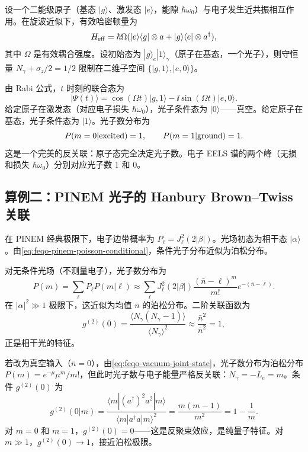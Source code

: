 \begin{workedexample}[二能级原子的光子统计]
设一个二能级原子（基态 \(|g\rangle\)、激发态 \(|e\rangle\)，能隙 \(\hbar\omega_0\)）与电子发生近共振相互作用。在旋波近似下，有效哈密顿量为
\[
H_{\rm eff}=\hbar\Omega(|e\rangle\langle g|\otimes a+|g\rangle\langle e|\otimes a^\dagger),
\]
其中 \(\Omega\) 是有效耦合强度。设初始态为 \(|g\rangle_e|1\rangle_\gamma\)（原子在基态，一个光子），则守恒量 \(N_\gamma+\sigma_z/2=1/2\) 限制在二维子空间 \(\{|g,1\rangle,|e,0\rangle\}\)。

由 Rabi 公式，\(t\) 时刻的联合态为
\[
|\Psi(t)\rangle=\cos(\Omega t)|g,1\rangle-\ii\sin(\Omega t)|e,0\rangle.
\]
给定原子在激发态（对应电子损失 \(\hbar\omega_0\)），光子条件态为 \(|0\rangle\)——真空。给定原子在基态，光子条件态为 \(|1\rangle\)。光子数分布为
\[
P(m=0|{\rm excited})=1,\qquad P(m=1|{\rm ground})=1.
\]
这是一个完美的反关联：原子态完全决定光子数。电子 EELS 谱的两个峰（无损和损失 \(\hbar\omega_0\)）分别对应光子数 1 和 0。
\end{workedexample}

\subsection{算例二：PINEM 光子的 Hanbury Brown--Twiss 关联}

\begin{workedexample}[PINEM 的 \(g^{(2)}(0)\)]
在 PINEM 经典极限下，电子边带概率为 \(P_\ell=J_\ell^2(2|\beta|)\)。光场初态为相干态 \(|\alpha\rangle\)。由\cref{eq:feqo-pinem-poisson-conditional}，条件光子分布近似为泊松分布。

对无条件光场（不测量电子），光子数分布为
\[
P(m)=\sum_\ell P_\ell P(m|\ell)\approx\sum_\ell J_\ell^2(2|\beta|)
\frac{(\bar n-\ell)^m}{m!}e^{-(\bar n-\ell)}.
\]
在 \(|\alpha|^2\gg1\) 极限下，这近似为均值 \(\bar n\) 的泊松分布。二阶关联函数为
\[
g^{(2)}(0)=\frac{\langle N_\gamma(N_\gamma-1)\rangle}{\langle N_\gamma\rangle^2}
\approx\frac{\bar n^2}{\bar n^2}=1,
\]
正是相干光的特征。

若改为真空输入（\(\bar n=0\)），由\cref{eq:feqo-vacuum-joint-state}，光子数分布为泊松分布 \(P(m)=e^{-\mu}\mu^m/m!\)，但此时光子数与电子能量严格反关联：\(N_\gamma=-L_e=m\)。条件 \(g^{(2)}(0)\) 为
\[
g^{(2)}(0|m)=\frac{\langle m|(a^\dagger)^2 a^2|m\rangle}{\langle m|a^\dagger a|m\rangle^2}
=\frac{m(m-1)}{m^2}=1-\frac{1}{m}.
\]
对 \(m=0\) 和 \(m=1\)，\(g^{(2)}(0)=0\)——这是反聚束效应，是纯量子特征。对 \(m\gg1\)，\(g^{(2)}(0)\to1\)，接近泊松极限。
\end{workedexample}

